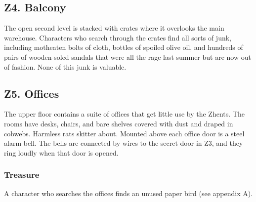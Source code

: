 \documentclass[10pt,a4paper,twoside,twocolumn,openany,nodeprecatedcode]{dndbook}
\begin{document}
\subsection{Z4. Balcony}
The open second level is stacked with crates where it overlooks the main warehouse. Characters who search through the crates find all sorts of junk, including motheaten bolts of cloth, bottles of spoiled olive oil, and hundreds of pairs of wooden-soled sandals that were all the rage last summer but are now out of fashion. None of this junk is valuable.
\subsection{Z5. Offices}
The upper floor contains a suite of offices that get little use by the Zhents. The rooms have desks, chairs, and bare shelves covered with dust and draped in cobwebs. Harmless rats skitter about.
Mounted above each office door is a steel alarm bell. The bells are connected by wires to the secret door in Z3, and they ring loudly when that door is opened.
\subsubsection{Treasure}
A character who searches the offices finds an unused paper bird (see appendix A).
\end{document}
